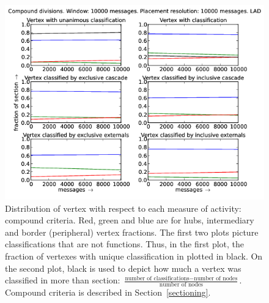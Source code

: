\documentclass[%
 aip,
 jmp,%
 amsmath,amssymb,
 reprint,%
]{revtex4-1}
\begin{document}
\begin{figure}[hbtp] 
   \centering
        \includegraphics[width=\textwidth]{figs/LAD/10000_2}
    \caption{Distribution of vertex with respect to each measure of activity: compound criteria. Red, green and blue are for hubs, intermediary and border (peripheral) vertex fractions. The first two plots picture classifications that are not functions. Thus, in the first plot, the fraction of vertexes with unique classification in plotted in black. On the second plot, black is used to depict how much a vertex was classified in more than section: $\frac{\text{number of classifications} - \text{number of nodes}}{\text{number of nodes}}$. Compound criteria is described in Section~\ref{sectioning}.}
    \label{fig:lad10000_}
\end{figure}
\end{document}
